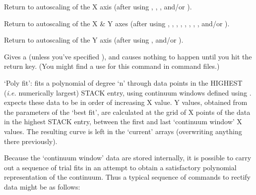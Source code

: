 \begin {description}
Return to autoscaling of the X axis (after using ,  ,  ,   
and/or ). 

Return to autoscaling of the X \& Y axes (after using ,  ,  , 
,  ,  ,  ,  ,  and/or ). 

Return to autoscaling of the Y axis (after using ,    and/or ). 

Gives a   (unless you've specified ),  and causes nothing to
happen until you hit the return key. (You might find a use for this
command in command files.)

`Poly fit': fits a polynomial of degree `n' through data points in the
HIGHEST ({\em i.e.} numerically largest) STACK entry, using continuum
windows defined using .    expects these data to be in order of
increasing X value. Y values, obtained from the parameters of the
`best fit', are calculated at the grid of X points of the data in the
highest STACK entry, between the first and last `continuum window' X
values. The resulting curve is left in the `current' arrays
(overwriting anything there previously).

Because the `continuum window' data are stored internally, it is
possible to carry out a sequence of trial fits in an attempt to obtain
a satisfactory polynomial representation of the continuum. Thus a
typical sequence of commands to rectify data might be as follows:


\end{description}
